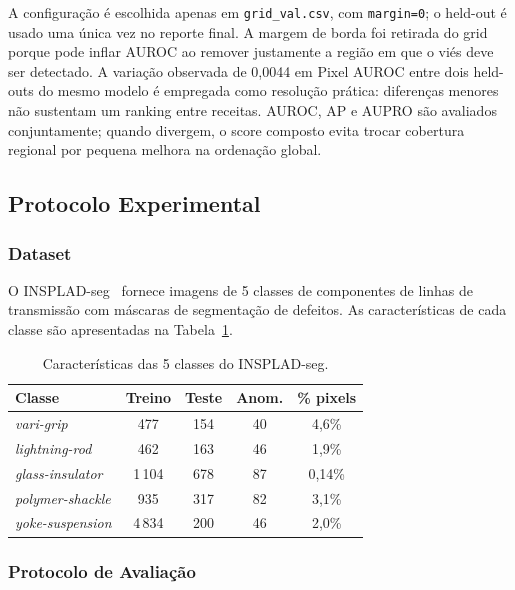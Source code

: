 \documentclass[conference]{IEEEtran}
\begin{document}
A configuração é escolhida apenas em \texttt{grid\_val.csv}, com \texttt{margin=0}; o held-out é usado uma única vez no reporte final. A margem de borda foi retirada do grid porque pode inflar AUROC ao remover justamente a região em que o viés deve ser detectado. A variação observada de 0{,}0044 em Pixel AUROC entre dois held-outs do mesmo modelo é empregada como resolução prática: diferenças menores não sustentam um ranking entre receitas. AUROC, AP e AUPRO são avaliados conjuntamente; quando divergem, o score composto evita trocar cobertura regional por pequena melhora na ordenação global.

\subsection{Protocolo Experimental}
\label{sec:protocol}

\subsubsection{Dataset}

O INSPLAD-seg~\cite{vieira2023insplad} fornece imagens de 5 classes de componentes de linhas de transmissão com máscaras de segmentação de defeitos. As características de cada classe são apresentadas na Tabela~\ref{tab:dataset}.

\begin{table}[htb]
\centering
\caption{Características das 5 classes do INSPLAD-seg.}
\label{tab:dataset}
\begin{tabular}{@{}lcccc@{}}
\toprule
Classe & Treino & Teste & Anom. & \% pixels \\
\midrule
\textit{vari-grip}          & 477   & 154  & 40  & 4{,}6\% \\
\textit{lightning-rod}      & 462   & 163  & 46  & 1{,}9\% \\
\textit{glass-insulator}    & 1\,104 & 678  & 87  & 0{,}14\% \\
\textit{polymer-shackle}    & 935   & 317  & 82  & 3{,}1\% \\
\textit{yoke-suspension}    & 4\,834 & 200  & 46  & 2{,}0\% \\
\bottomrule
\end{tabular}
\end{table}

\subsubsection{Protocolo de Avaliação}
\end{document}
